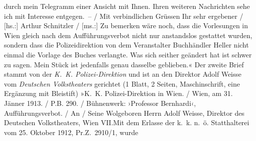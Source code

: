 {{{                        durch mein Telegramm einer Ansicht mit Ihnen. Ihren weiteren Nachrichten
                        sehe ich mit Interesse entgegen. –{ / }Mit verbindlichen Grüssen Ihr sehr ergebener{ / }{[}hs.:{]} Arthur Schnitzler { / }{[}ms.:{]} Zu bemerken wäre noch, dass die Vorlesungen
                        in Wien gleich nach dem Aufführungsverbot
                        nicht nur anstandslos gestattet wurden, sondern dass die Polizeidirektion von dem Veranstalter Buchhändler Heller nicht einmal die Vorlage des Buches verlangte. Was
                        sich seither geändert hat ist schwer zu sagen. Mein Stück ist jedenfalls genau
                        dasselbe geblieben.« Der zweite Brief stammt von der \emph{K. K.
                     Polizei-Direktion} und ist an den Direktor Adolf Weisse vom \emph{Deutschen
                     Volkstheaters} gerichtet (1 Blatt, 2 Seiten, Maschinschrift, eine Ergänzung
                  mit Bleistift) »K. K. Polizei-Direktion in Wien.{ / }Wien, am 31. Jänner
                        1913.{ / }P.B. 290.{ / }Bühnenwerk: ›Professor Bernhardi‹,
                        Aufführungsverbot.{ / }An{ / }Seine Wolgeboren Herrn Adolf Weisse,
                        Direktor des Deutschen Volkstheaters,
                           Wien VII.Mit dem Erlasse der k. k. n. ö.
                           Statthalterei vom 25. Oktober 1912, Pr.Z. 2910/1, wurde
}}}
